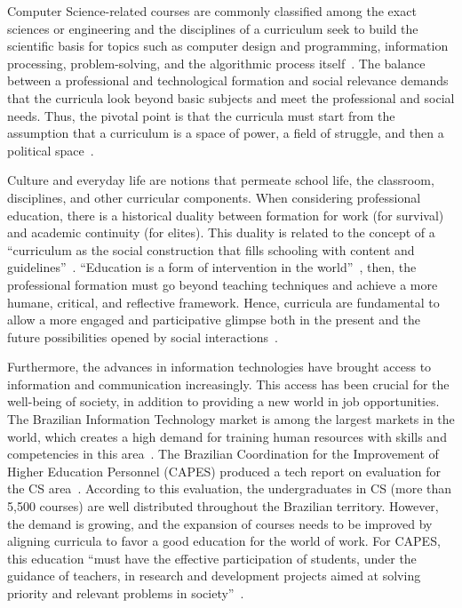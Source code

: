 \documentclass[sigconf, review]{educomp}
\begin{document}
Computer Science-related courses are commonly classified among the exact sciences or engineering and the disciplines of a curriculum seek to build the scientific basis for topics such as computer design and programming, information processing, problem-solving, and the algorithmic process itself~\cite{brookshear2013ciencia}.
The balance between a professional and technological formation and social relevance demands that the curricula look beyond basic subjects and meet the professional and social needs.
Thus, the pivotal point is that the curricula must start from the assumption that a curriculum is a space of power, a field of struggle, and then a political space~\cite{hornburg2007teorias}.

Culture and everyday life are notions that permeate school life, the classroom, disciplines, and other curricular components.
When considering professional education, there is a historical duality between formation for work (for survival) and academic continuity (for elites).
This duality is related to the concept of a ``curriculum as the social construction that fills schooling with content and guidelines''~\cite{gimeno2000curriculo}.
``Education is a form of intervention in the world''~\cite{freire2002pedagogia}, then, the professional formation must go beyond teaching techniques and achieve a more humane, critical, and reflective framework.
Hence, curricula are fundamental to allow a more engaged and participative glimpse both in the present and the future possibilities opened by social interactions~\cite{souza2010}.

Furthermore, the advances in information technologies have brought access to information and communication increasingly.
This access has been crucial for the well-being of society, in addition to providing a new world in job opportunities.
The Brazilian Information Technology market is among the largest markets in the world, which creates a high demand for training human resources with skills and competencies in this area~\cite{capes2019}.
The Brazilian Coordination for the Improvement of Higher Education Personnel (CAPES) produced a tech report on evaluation for the CS area~\cite{capes2019}.
According to this evaluation, the undergraduates in CS (more than 5,500 courses) are well distributed throughout the Brazilian territory.
However, the demand is growing, and the expansion of courses needs to be improved by aligning curricula to favor a good education for the world of work.
For CAPES, this education ``must have the effective participation of students, under the guidance of teachers, in research and development projects aimed at solving priority and relevant problems in society''~\cite{capes2019}.
\end{document}
